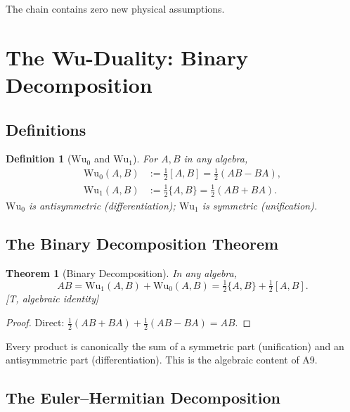 \documentclass[11pt, a4paper]{article}
\newtheorem{theorem}{Theorem}
\newtheorem{definition}{Definition}
\newcommand{\Wuz}{\mathrm{Wu}_0}
\newcommand{\Wuo}{\mathrm{Wu}_1}
\begin{document}
The chain contains zero new physical assumptions.


\section{The Wu-Duality: Binary Decomposition}
\label{sec:wu_duality}

\subsection{Definitions}

\begin{definition}[$\Wuz$ and $\Wuo$]
\label{def:wu}
For $A, B$ in any algebra,
\begin{align}
\Wuz(A, B) &:= \tfrac{1}{2}[A, B] = \tfrac{1}{2}(AB - BA), \\
\Wuo(A, B) &:= \tfrac{1}{2}\{A, B\} = \tfrac{1}{2}(AB + BA).
\end{align}
$\Wuz$ is antisymmetric (differentiation);
$\Wuo$ is symmetric (unification).
\end{definition}

\subsection{The Binary Decomposition Theorem}

\begin{theorem}[Binary Decomposition]
\label{thm:binary}
In any algebra,
\begin{equation}
\boxed{\;AB = \Wuo(A, B) + \Wuz(A, B) = \tfrac{1}{2}\{A, B\} + \tfrac{1}{2}[A, B].\;}
\label{eq:binary}
\end{equation}
[T, algebraic identity]
\end{theorem}

\begin{proof}
Direct: $\tfrac{1}{2}(AB + BA) + \tfrac{1}{2}(AB - BA) = AB$.
\end{proof}

Every product is canonically the sum of a symmetric part
(unification) and an antisymmetric part (differentiation). This is
the algebraic content of A9.

\subsection{The Euler--Hermitian Decomposition}
\end{document}
